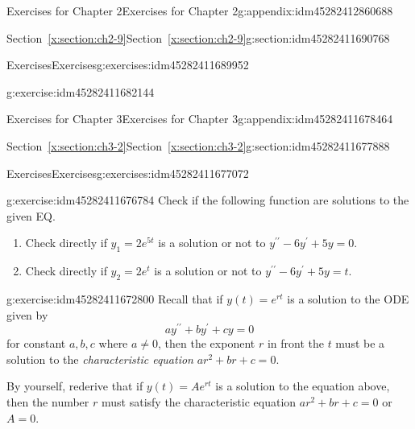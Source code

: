 \documentclass[oneside,10pt,]{book}
\numberwithin{equation}{section}
\numberwithin{equation}{section}
\begin{document}
\begin{appendixptx}{Exercises for Chapter 2}{}{Exercises for Chapter 2}{}{}{g:appendix:idm45282412860688}
\begin{sectionptx}{Section~\ref*{x:section:ch2-9}}{}{Section~\ref*{x:section:ch2-9}}{}{}{g:section:idm45282411690768}
\begin{exercises-subsection-numberless}{Exercises}{}{Exercises}{}{}{g:exercises:idm45282411689952}
\begin{divisionexercise}{4}{}{}{g:exercise:idm45282411682144}
\begin{image}{0}{1}{0}
\end{image}%
%
\end{divisionexercise}%
\end{exercises-subsection-numberless}
\end{sectionptx}
\end{appendixptx}
%
%
\typeout{************************************************}
\typeout{************************************************}
%
\begin{appendixptx}{Exercises for Chapter 3}{}{Exercises for Chapter 3}{}{}{g:appendix:idm45282411678464}
%
%
\typeout{************************************************}
\typeout{************************************************}
%
\begin{sectionptx}{Section~\ref*{x:section:ch3-2}}{}{Section~\ref*{x:section:ch3-2}}{}{}{g:section:idm45282411677888}
%
%
\typeout{************************************************}
\typeout{************************************************}
%
\begin{exercises-subsection-numberless}{Exercises}{}{Exercises}{}{}{g:exercises:idm45282411677072}
\begin{divisionexercise}{1}{}{}{g:exercise:idm45282411676784}%
Check if the following function are solutions to the given EQ.%
\begin{enumerate}[label=(\alph*)]
\item{}Check directly if \(y_{1}=2e^{5t}\) is a solution or not to \(y^{\prime\prime}-6y^{\prime}+5y=0\).%
\item{}Check directly if \(y_{2}=2e^{t}\) is a solution or not to \(y^{\prime\prime}-6y^{\prime}+5y=t\).%
\end{enumerate}
%
\end{divisionexercise}%
\begin{divisionexercise}{2}{}{}{g:exercise:idm45282411672800}%
Recall that if \(y(t)=e^{rt}\) is a solution to the ODE given by%
\begin{equation*}
ay^{\prime\prime}+by^{\prime}+cy=0
\end{equation*}
for constant \(a,b,c\) where \(a\ne0\), then the exponent \(r\) in front the \(t\) must be a solution to the \emph{characteristic equation} \(ar^{2}+br+c=0\).%
\par
By yourself, rederive that if \(y(t)=Ae^{rt}\) is a solution to the equation above, then the number \(r\) must satisfy the characteristic equation \(ar^{2}+br+c=0\) or \(A=0\).%

\end{divisionexercise}
\end{exercises-subsection-numberless}
\end{sectionptx}
\end{appendixptx}
\end{document}

